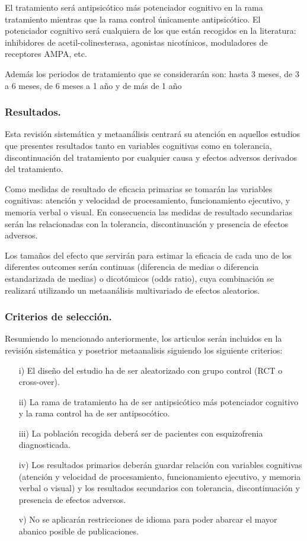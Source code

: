 \documentclass[a4paper,openright,12pt]{report}
\begin{document}
El tratamiento será antipsicótico más potenciador cognitivo en la rama tratamiento mientras que la rama control únicamente antipsicótico. El potenciador cognitivo será cualquiera de los que están recogidos en la literatura: inhibidores de acetil-colinesterasa, agonistas nicotínicos, moduladores de receptores AMPA, etc. 

Además los periodos de tratamiento que se considerarán son: hasta 3 meses, de 3 a 6 meses, de 6 meses a 1 año y de más de 1 año

\subsubsection{Resultados.}

Esta revisión sistemática y metaanálisis centrará su atención en aquellos estudios que presentes resultados tanto en variables cognitivas como en tolerancia, discontinuación del tratamiento por cualquier causa y efectos adversos derivados del tratamiento.

Como medidas de resultado de eficacia primarias se tomarán las variables cognitivas: atención y velocidad de procesamiento, funcionamiento ejecutivo, y memoria verbal o visual. En consecuencia las medidas de resultado secundarias serán las relacionadas con la tolerancia, discontinuación y presencia de efectos adversos.

Los tamaños del efecto que servirán para estimar la eficacia de cada uno de los diferentes outcomes serán continuas (diferencia de medias o diferencia estandarizada de medias) o dicotómicos (odds ratio), cuya combinación se realizará utilizando un metaanálisis multivariado de efectos aleatorios.

\subsubsection{Criterios de selección.}

Resumiendo lo mencionado anteriormente, los articulos serán incluidos en la revisión sistemática y posetrior metaanalisis siguiendo los siguiente criterios:
\begin{itemize}
\item[i)] El diseño del estudio ha de ser aleatorizado con grupo control (RCT o cross-over).
\item[ii)] La rama de tratamiento ha de ser antipsicótico más potenciador cognitivo y la rama control ha de ser antipsocótico.
\item[iii)] La población recogida deberá ser de pacientes con esquizofrenia diagnosticada.
\item[iv)] Los resultados primarios deberán guardar relación con variables cognitivas (atención y velocidad de procesamiento, funcionamiento ejecutivo, y memoria verbal o visual) y los resultados secundarios con tolerancia, discontinuación y presencia de efectos adversos.
\item[v)] No se aplicarán restricciones de idioma para poder abarcar el mayor abanico posible de publicaciones.
\end{itemize}
\end{document}
